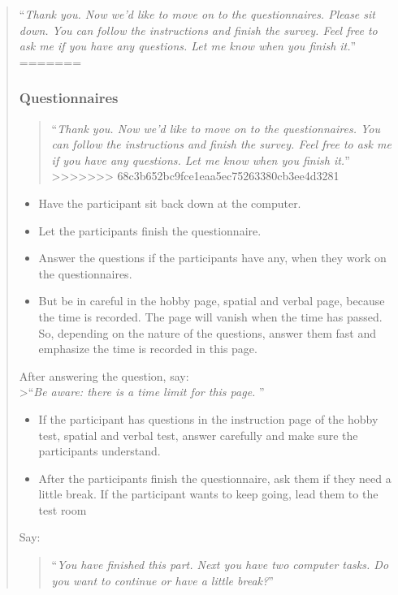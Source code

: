 \documentclass[]{article}
\providecommand{\tightlist}{%
  \setlength{\itemsep}{0pt}\setlength{\parskip}{0pt}}
\begin{document}
\begin{quote}
``\emph{Thank you. Now we'd like to move on to the questionnaires.
Please sit down. You can follow the instructions and finish the survey.
Feel free to ask me if you have any questions. Let me know when you
finish it.}''
=======
\hypertarget{questionnaires}{%
\subsubsection{Questionnaires}\label{questionnaires}}

\begin{quote}
``\emph{Thank you. Now we'd like to move on to the questionnaires. You
can follow the instructions and finish the survey. Feel free to ask me
if you have any questions. Let me know when you finish it.}''
>>>>>>> 68c3b652bc9fce1eaa5ec75263380cb3ee4d3281
\end{quote}

\begin{itemize}
\tightlist
\item
  Have the participant sit back down at the computer.
\item
  Let the participants finish the questionnaire.
\item
  Answer the questions if the participants have any, when they work on
  the questionnaires.
\item
  But be in careful in the hobby page, spatial and verbal page, because
  the time is recorded. The page will vanish when the time has passed.
  So, depending on the nature of the questions, answer them fast and
  emphasize the time is recorded in this page.
\end{itemize}

After answering the question, say:\\
\textgreater{}``\emph{Be aware: there is a time limit for this page. }''

\begin{itemize}
\tightlist
\item
  If the participant has questions in the instruction page of the hobby
  test, spatial and verbal test, answer carefully and make sure the
  participants understand.
\item
  After the participants finish the questionnaire, ask them if they need
  a little break. If the participant wants to keep going, lead them to
  the test room
\end{itemize}

Say:

\begin{quote}
``\emph{You have finished this part. Next you have two computer tasks.
Do you want to continue or have a little break?}''
\end{quote}


\end{quote}
\end{document}
